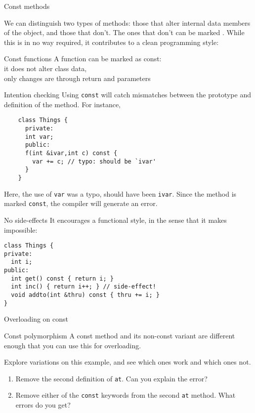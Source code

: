  {Const methods}

We can distinguish two types of methods: those that alter internal
data members of the object, and those that don't. The ones that don't
can be marked .
While this is in no way required, it contributes to a clean
programming style:

\begin{slide}{Const functions}
  \label{sl:const-function}
  A function can be marked as const:\\
  it does not alter class data,\\
  only changes are through return and parameters
\end{slide}

\begin{block}{Intention checking}
  Using \lstinline{const} will catch mismatches between the prototype
  and definition of the method. For instance,
  \begin{lstlisting}
    class Things {
      private:
      int var;
      public:
      f(int &ivar,int c) const {
        var += c; // typo: should be `ivar'
      }
    }
  \end{lstlisting}
\end{block}

Here, the use of \lstinline{var} was a typo, should have been \lstinline{ivar}. Since
the method is marked \lstinline{const}, the compiler will generate an error.

\begin{block}{No side-effects}
  \label{sl:const-sideeffect}
  It encourages a functional style, in the sense that it makes
   impossible:
\begin{lstlisting}
class Things {
private:
  int i;
public:
  int get() const { return i; }
  int inc() { return i++; } // side-effect!
  void addto(int &thru) const { thru += i; }
}
\end{lstlisting}
\end{block}

 {Overloading on const}
\label{sec:const-overload}

\begin{block}{Const polymorphism}
  \label{sl:const-poly}
  A const method and its non-const variant are different enough that you
  can use this for overloading.
\end{block}

\begin{exercise}
  \label{ex:const-poly}
  Explore variations on this example, and see which ones work and
  which ones not.
  \begin{enumerate}
  \item Remove the second definition of \lstinline{at}. Can you
    explain the error?
  \item
    Remove either of the \lstinline{const} keywords from the second
    \lstinline{at} method. What errors do you get?
  \end{enumerate}
\end{exercise}

